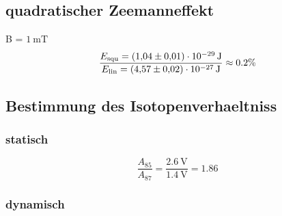 \begin{table}[h]
\end{table}
\subsection{quadratischer Zeemanneffekt}%
\label{sub:quadratischer_zeemanneffekt}

B = $\SI{1}{\milli\tesla}$
\begin{equation}
	\frac{E_\text{squ} = \SI{1.04 +- 0.01e-29}{\joule}}{E_\text{lin} = 
		\SI{4.57 +- 0.02e-27}{\joule}} \approx 0.2 \%
\end{equation}



\subsection{Bestimmung des Isotopenverhaeltniss}%
\label{sub:bestimmung_des_isotopenverhaeltniss}

\subsubsection{statisch}%
\label{ssub:statisch}

\begin{equation}
	\frac{A_{85}}{A_{87}} = \frac{\SI{2.6}{\volt}}{\SI{1.4}{\volt}} = 1.86 
\end{equation}

\subsubsection{dynamisch}%
\label{ssub:dynamisch}



